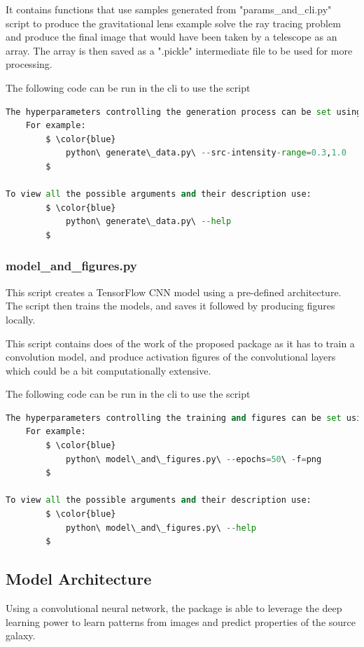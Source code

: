 \documentclass[12pt]{article}
\begin{document}
It contains functions that use samples generated from "params\_and\_cli.py" script to produce the gravitational lens example solve the ray tracing problem and produce the final image that would have been taken by a telescope as an array. The array is then saved as a ".pickle" intermediate file to be used for more processing.

The following code can be run in the cli to use the script

\begin{lstlisting}[mathescape=true, language=python]
The hyperparameters controlling the generation process can be set using the cli arguments while running the script.
    For example:
        $ \color{blue}
            python\ generate\_data.py\ --src-intensity-range=0.3,1.0
        $
        
To view all the possible arguments and their description use:
        $ \color{blue}
            python\ generate\_data.py\ --help
		$
\end{lstlisting}

\subsubsection{model\_and\_figures.py}
This script creates a TensorFlow CNN model using a pre-defined architecture. The script then trains the models, and saves it followed by producing figures locally.

This script contains does of the work of the proposed package as it has to train a convolution model, and produce activation figures of the convolutional layers which could be a bit computationally extensive.

The following code can be run in the cli to use the script

\begin{lstlisting}[mathescape=true, language=python]
The hyperparameters controlling the training and figures can be set using the cli arguments while running the script.
    For example:
        $ \color{blue}
            python\ model\_and\_figures.py\ --epochs=50\ -f=png
        $
        
To view all the possible arguments and their description use:
        $ \color{blue}
            python\ model\_and\_figures.py\ --help
		$
\end{lstlisting}

\subsection{Model Architecture}
Using a convolutional neural network, the package is able to leverage the deep learning power to learn patterns from images and predict properties of the source galaxy.
\end{document}
